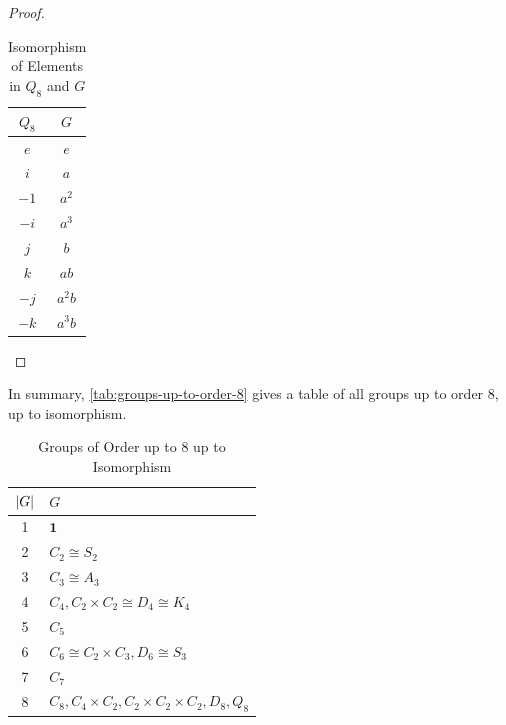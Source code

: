 \documentclass{article}
\theoremstyle{definition}
\theoremstyle{remark}
\DeclarePairedDelimiter{\abs}{\lvert}{\rvert}
\newcommand{\isomorphic}{\cong}
\newcommand{\trivialgp}{\mathbf{1}}
\begin{document}
\begin{proof}
\begin{itemize}
\begin{itemize}
            \begin{table}[ht!]
                \centering
                \begin{tabular}{cc}
                    \(Q_8\) & \(G\) \\
                    \hline
                    \(e\) & \(e\) \\
                    \(i\) & \(a\) \\
                    \(-1\) & \(a^2\) \\
                    \(-i\) & \(a^3\) \\
                    \(j\) & \(b\) \\
                    \(k\) & \(a b\) \\
                    \(-j\) & \(a^2 b\) \\
                    \(-k\) & \(a^3 b\)
                \end{tabular}
                \caption{Isomorphism of Elements in \(Q_8\) and \(G\)}
                \label{tab:quartonian-group-isomorphism}
            \end{table}
        \end{itemize}
    \end{itemize}
\end{proof}

In summary, \autoref{tab:groups-up-to-order-8} gives a table of all groups up to order 8, up to isomorphism.

\begin{table}[ht!]
    \centering
    \begin{tabular}{cl}
        \(\abs{G}\) & \(G\) \\
        \hline
        1 & \(\trivialgp\) \\
        2 & \(C_2 \isomorphic S_2\) \\
        3 & \(C_3 \isomorphic A_3\) \\
        4 & \(C_4, C_2 \times C_2 \isomorphic D_4 \isomorphic K_4\) \\
        5 & \(C_5\) \\
        6 & \(C_6 \isomorphic C_2 \times C_3, D_6 \isomorphic S_3\) \\
        7 & \(C_7\) \\
        8 & \(C_8, C_4 \times C_2, C_2 \times C_2 \times C_2, D_8, Q_8\)
    \end{tabular}
    \caption{Groups of Order up to 8 up to Isomorphism}
    \label{tab:groups-up-to-order-8}
\end{table}
\end{document}
